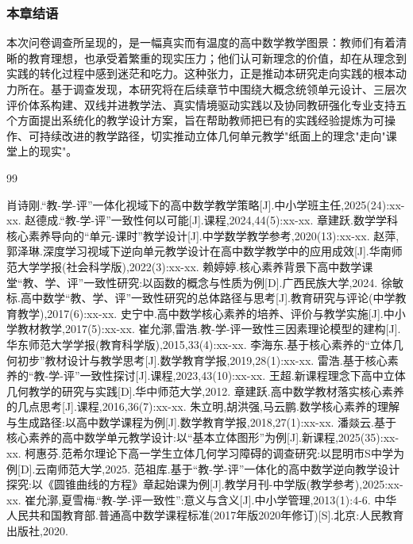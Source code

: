 \documentclass[UTF8,a4paper,12pt,twoside]{ctexart}
\begin{document}
\subsubsection{本章结语}

本次问卷调查所呈现的，是一幅真实而有温度的高中数学教学图景：教师们有着清晰的教育理想，也承受着繁重的现实压力；他们认可新理念的价值，却在从理念到实践的转化过程中感到迷茫和吃力。这种张力，正是推动本研究走向实践的根本动力所在。基于调查发现，本研究将在后续章节中围绕大概念统领单元设计、三层次评价体系构建、双线并进教学法、真实情境驱动实践以及协同教研强化专业支持五个方面提出系统化的教学设计方案，旨在帮助教师把已有的实践经验提炼为可操作、可持续改进的教学路径，切实推动立体几何单元教学"纸面上的理念"走向"课堂上的现实"。
\newpage

\begin{thebibliography}{99}
\setlength{\itemsep}{-0.75ex}
肖诗刚.``教-学-评''一体化视域下的高中数学教学策略[J].中小学班主任,2025(24):xx-xx.
赵德成.``教-学-评''一致性何以可能[J].课程,2024,44(5):xx-xx.
章建跃.数学学科核心素养导向的``单元-课时''教学设计[J].中学数学教学参考,2020(13):xx-xx.
赵萍,郭泽琳.深度学习视域下逆向单元教学设计在高中数学教学中的应用成效[J].华南师范大学学报(社会科学版),2022(3):xx-xx.
赖婷婷.核心素养背景下高中数学课堂``教、学、评''一致性研究:以函数的概念与性质为例[D].广西民族大学,2024.
徐敏标.高中数学``教、学、评''一致性研究的总体路径与思考[J].教育研究与评论(中学教育教学),2017(6):xx-xx.
史宁中.高中数学核心素养的培养、评价与教学实施[J].中小学教材教学,2017(5):xx-xx.
崔允漷,雷浩.教-学-评一致性三因素理论模型的建构[J].华东师范大学学报(教育科学版),2015,33(4):xx-xx.
李海东.基于核心素养的``立体几何初步''教材设计与教学思考[J].数学教育学报,2019,28(1):xx-xx.
雷浩.基于核心素养的``教-学-评''一致性探讨[J].课程,2023,43(10):xx-xx.
王超.新课程理念下高中立体几何教学的研究与实践[D].华中师范大学,2012.
章建跃.高中数学教材落实核心素养的几点思考[J].课程,2016,36(7):xx-xx.
朱立明,胡洪强,马云鹏.数学核心素养的理解与生成路径:以高中数学课程为例[J].数学教育学报,2018,27(1):xx-xx.
潘燚云.基于核心素养的高中数学单元教学设计:以``基本立体图形''为例[J].新课程,2025(35):xx-xx.
柯惠芬.范希尔理论下高一学生立体几何学习障碍的调查研究:以昆明市S中学为例[D].云南师范大学,2025.
范祖库.基于``教-学-评''一体化的高中数学逆向教学设计探究:以《圆锥曲线的方程》章起始课为例[J].教学月刊-中学版(教学参考),2025:xx-xx.
崔允漷,夏雪梅.``教-学-评一致性'':意义与含义[J].中小学管理,2013(1):4-6.
中华人民共和国教育部.普通高中数学课程标准(2017年版2020年修订)[S].北京:人民教育出版社,2020.
\end{thebibliography}
\newpage
\end{document}
